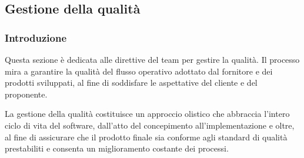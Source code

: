 \subsection{Gestione della qualità}
\subsubsection{Introduzione}
Questa sezione è dedicata alle direttive del team per gestire la qualità. Il processo mira a garantire la qualità del flusso operativo adottato dal fornitore e dei prodotti sviluppati, al fine di soddisfare le aspettative del cliente e del proponente.

La gestione della qualità costituisce un approccio olistico che abbraccia l'intero ciclo di vita del software, dall'atto del concepimento all'implementazione e oltre, al fine di assicurare che il prodotto finale sia conforme agli standard di qualità prestabiliti e consenta un miglioramento costante dei processi.

